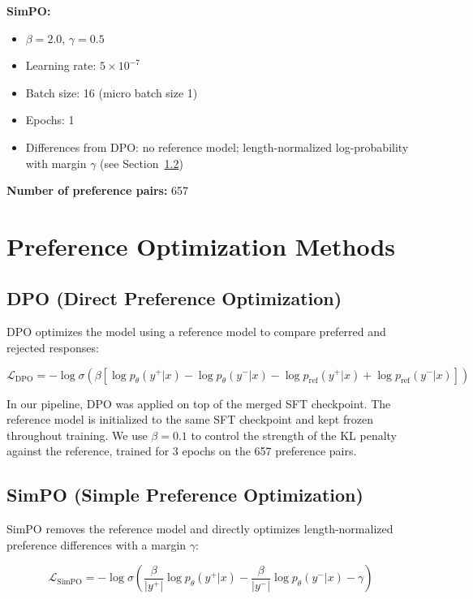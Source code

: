 \documentclass{article}
\begin{document}
\textbf{SimPO:}
\begin{itemize}
    \item $\beta = 2.0$, $\gamma = 0.5$
    \item Learning rate: $5 \times 10^{-7}$
    \item Batch size: 16 (micro batch size 1)
    \item Epochs: 1
    \item Differences from DPO: no reference model; length-normalized log-probability with margin $\gamma$ (see Section~\ref{sec:simpo})
\end{itemize}

\textbf{Number of preference pairs:} 657

\section{Preference Optimization Methods}

\subsection{DPO (Direct Preference Optimization)}

DPO optimizes the model using a reference model to compare preferred and rejected responses:

\begin{equation}
\mathcal{L}_{\text{DPO}} =
- \log \sigma \left( \beta \left[
\log p_\theta(y^+|x) - \log p_\theta(y^-|x)
- \log p_{\text{ref}}(y^+|x) + \log p_{\text{ref}}(y^-|x)
\right] \right)
\end{equation}

In our pipeline, DPO was applied on top of the merged SFT checkpoint. The reference model is initialized to the same SFT checkpoint and kept frozen throughout training. We use $\beta = 0.1$ to control the strength of the KL penalty against the reference, trained for 3 epochs on the 657 preference pairs.

\subsection{SimPO (Simple Preference Optimization)}
\label{sec:simpo}

SimPO removes the reference model and directly optimizes length-normalized preference differences with a margin $\gamma$:

\begin{equation}
\mathcal{L}_{\text{SimPO}} =
- \log \sigma \left(
\frac{\beta}{|y^+|} \log p_\theta(y^+|x)
- \frac{\beta}{|y^-|} \log p_\theta(y^-|x)
- \gamma
\right)
\end{equation}
\end{document}
